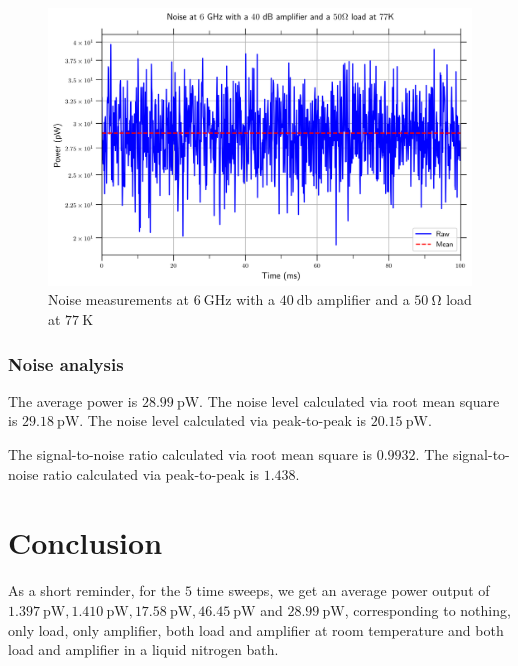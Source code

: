 \documentclass[english,12pt,a4paper]{article}
\begin{document}
\begin{figure}[H]
	\includegraphics[width=1\linewidth]{Plots/noise_floor_6_GHz_amplif_50ohm_lt}
	\caption{Noise measurements at $\qty{6}{\giga\hertz}$ with a $\qty{40}{\decibel}$ amplifier and a $\qty{50}{\ohm}$ load at $\qty{77}{\kelvin}$}
	\label{fig:noisefloor6ghzamplif50ohmlt}
\end{figure}

 

\hypertarget{noise-analysis}{%
	\subsubsection{Noise analysis}\label{noise-analysis_7}}


	The average power is $\qty{28.99}{\pico\watt}$.
	The noise level calculated via root mean square is $\qty{29.18}{\pico\watt}$.
	The noise level calculated via peak-to-peak is $\qty{20.15}{\pico\watt}$.
	
	The signal-to-noise ratio calculated via root mean square is $0.9932$.
	The signal-to-noise ratio calculated via peak-to-peak is $1.438$.

\newpage
\section{Conclusion}

As a short reminder, for the $5$ time sweeps, we get an average power output of $\qty{1.397}{\pico\watt}, \qty{1.410}{\pico\watt}, \qty{17.58}{\pico\watt}, \qty{46.45}{\pico\watt}$ and $\qty{28.99}{\pico\watt}$, corresponding to nothing, only load, only amplifier, both load and amplifier at room temperature and both load and amplifier in a liquid nitrogen bath. 
\end{document}
